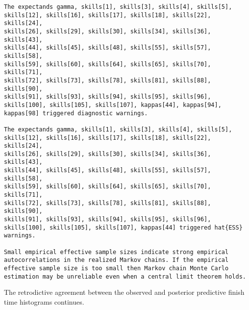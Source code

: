 \documentclass[
  letterpaper,
  DIV=11,
  numbers=noendperiod]{scrartcl}
\newenvironment{Shaded}{\begin{snugshade}}{\end{snugshade}}
\newcommand{\AttributeTok}[1]{\textcolor[rgb]{0.40,0.45,0.13}{#1}}
\newcommand{\DecValTok}[1]{\textcolor[rgb]{0.68,0.00,0.00}{#1}}
\newcommand{\FunctionTok}[1]{\textcolor[rgb]{0.28,0.35,0.67}{#1}}
\newcommand{\NormalTok}[1]{\textcolor[rgb]{0.00,0.23,0.31}{#1}}
\newcommand{\SpecialCharTok}[1]{\textcolor[rgb]{0.37,0.37,0.37}{#1}}
\newcommand{\StringTok}[1]{\textcolor[rgb]{0.13,0.47,0.30}{#1}}
\begin{document}
\begin{verbatim}
The expectands gamma, skills[1], skills[3], skills[4], skills[5],
skills[12], skills[16], skills[17], skills[18], skills[22], skills[24],
skills[26], skills[29], skills[30], skills[34], skills[36], skills[43],
skills[44], skills[45], skills[48], skills[55], skills[57], skills[58],
skills[59], skills[60], skills[64], skills[65], skills[70], skills[71],
skills[72], skills[73], skills[78], skills[81], skills[88], skills[90],
skills[91], skills[93], skills[94], skills[95], skills[96],
skills[100], skills[105], skills[107], kappas[44], kappas[94],
kappas[98] triggered diagnostic warnings.

The expectands gamma, skills[1], skills[3], skills[4], skills[5],
skills[12], skills[16], skills[17], skills[18], skills[22], skills[24],
skills[26], skills[29], skills[30], skills[34], skills[36], skills[43],
skills[44], skills[45], skills[48], skills[55], skills[57], skills[58],
skills[59], skills[60], skills[64], skills[65], skills[70], skills[71],
skills[72], skills[73], skills[78], skills[81], skills[88], skills[90],
skills[91], skills[93], skills[94], skills[95], skills[96],
skills[100], skills[105], skills[107], kappas[44] triggered hat{ESS}
warnings.

Small empirical effective sample sizes indicate strong empirical
autocorrelations in the realized Markov chains. If the empirical
effective sample size is too small then Markov chain Monte Carlo
estimation may be unreliable even when a central limit theorem holds.
\end{verbatim}

The retrodictive agreement between the observed and posterior predictive
finish time histograms continues.

\begin{Shaded}
\end{Shaded}
\end{document}
